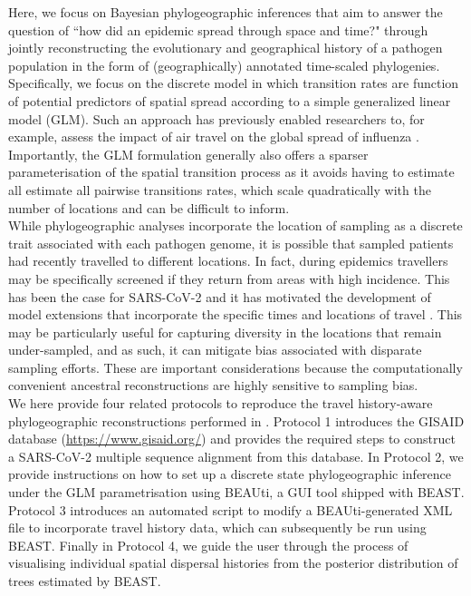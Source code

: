 \documentclass{article}
\begin{document}
Here, we focus on Bayesian phylogeographic inferences that aim to answer the question of ``how did an epidemic spread through space and time?" through jointly reconstructing the evolutionary and geographical history of a pathogen population in the form of (geographically) annotated time-scaled phylogenies.
Specifically, we focus on the discrete model in which transition rates are function of potential predictors of spatial spread according to a simple generalized linear model (GLM).
Such an approach has previously enabled researchers to, for example, assess the impact of air travel on the global spread of influenza \cite{glm}.
Importantly, the GLM formulation generally also offers a sparser parameterisation of the spatial transition process as it avoids having to estimate all estimate all pairwise transitions rates, which scale quadratically with the number of locations and can be difficult to inform. \\

While phylogeographic analyses incorporate the location of sampling as a discrete trait associated with each pathogen genome, it is possible that sampled patients had recently travelled to different locations.
In fact, during epidemics travellers may be specifically screened if they return from areas with high incidence. This has been the case for SARS-CoV-2 and it has motivated the development of model extensions that incorporate the specific times and locations of travel \cite{travhist}. This may be particularly useful for capturing diversity in the locations that remain under-sampled, and as such, it can mitigate bias associated with disparate sampling efforts.
These are important considerations because the computationally convenient ancestral reconstructions are highly sensitive to sampling bias. \\


We here provide four related protocols to reproduce the travel history-aware phylogeographic reconstructions performed in \cite{travhist}.
Protocol 1 introduces the GISAID database \cite{gisaid} (\url{https://www.gisaid.org/}) and provides the required steps to construct a SARS-CoV-2 multiple sequence alignment from this database.
In Protocol 2, we provide instructions on how to set up a discrete state phylogeographic inference under the GLM parametrisation using BEAUti, a GUI tool shipped with BEAST.
Protocol 3 introduces an automated script to modify a BEAUti-generated XML file to incorporate travel history data, which can subsequently be run using BEAST.
Finally in Protocol 4, we guide the user through the process of visualising individual spatial dispersal histories from the posterior distribution of trees estimated by BEAST.
\end{document}

